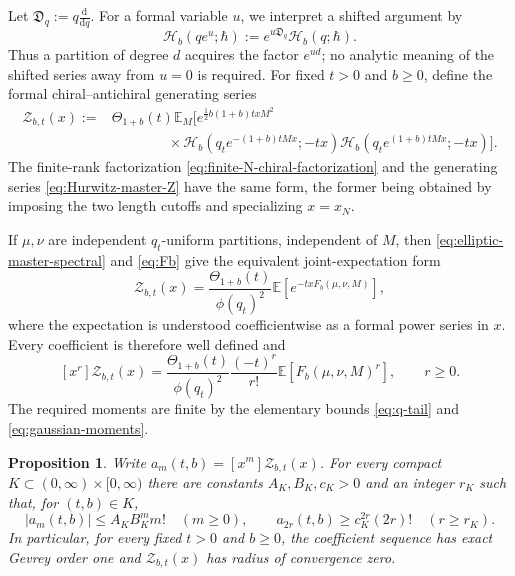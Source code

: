 \documentclass[11pt,a4paper,reqno]{article}
\newtheorem{proposition}[theorem]{Proposition}
\theoremstyle{definition}
\theoremstyle{remark}
\newcommand\E{{\mathbb E}}
\newcommand\dd{{\mathrm d}}
\begin{document}
Let $\mathfrak{D}_q:=q\frac{\dd}{\dd q}$.  For a formal variable $u$, we interpret a shifted argument by
\begin{equation}\label{eq:formal-q-shift}
\mathscr H_b(qe^u;\hbar) :=e^{u\mathfrak{D}_q}\mathscr H_b(q;\hbar).
\end{equation}
Thus a partition of degree $d$ acquires the factor $e^{ud}$; no analytic meaning of the shifted series away from $u=0$ is required.  For fixed $t>0$ and $b\geq0$, define the formal chiral--antichiral generating series
\begin{equation}\label{eq:Hurwitz-master-Z}
\begin{aligned}
\mathcal Z_{b,t}(x):={}&\Theta_{1+b}(t)\E_M\Big[e^{\frac12 b(1+b)txM^2}\\ &\qquad\qquad\times\mathscr H_b(q_t e^{-(1+b)tMx};-tx)\mathscr H_b(q_t e^{(1+b)tMx};-tx)\Big].
\end{aligned}
\end{equation}
The finite-rank factorization \eqref{eq:finite-N-chiral-factorization} and the generating series \eqref{eq:Hurwitz-master-Z} have the same form, the former being obtained by imposing the two length cutoffs and specializing $x=x_N$.

If $\mu,\nu$ are independent $q_t$-uniform partitions, independent of $M$, then \eqref{eq:elliptic-master-spectral} and \eqref{eq:Fb} give the equivalent joint-expectation form
\begin{equation}\label{eq:Hurwitz-master-expectation}
\mathcal Z_{b,t}(x) =\frac{\Theta_{1+b}(t)}{\phi(q_t)^2} \E\left[e^{-txF_b(\mu,\nu,M)}\right],
\end{equation}
where the expectation is understood coefficientwise as a formal power series in $x$.  Every coefficient is therefore well defined and
\begin{equation}\label{eq:master-coefficients}
[x^r]\mathcal Z_{b,t}(x) =\frac{\Theta_{1+b}(t)}{\phi(q_t)^2} \frac{(-t)^r}{r!} \E\left[F_b(\mu,\nu,M)^r\right], \qquad r\geq0.
\end{equation}
The required moments are finite by the elementary bounds \eqref{eq:q-tail} and \eqref{eq:gaussian-moments}.

\begin{proposition}\label{prop:master-zero-radius}
Write $a_m(t,b)=[x^m]\mathcal Z_{b,t}(x)$.  For every compact $K\subset(0,\infty)\times[0,\infty)$ there are constants $A_K,B_K,c_K>0$ and an integer $r_K$ such that, for $(t,b)\in K$,
\begin{equation}\label{eq:gevrey-coefficient-bounds}
|a_m(t,b)|\leq A_K B_K^m m!\quad(m\geq0), \qquad a_{2r}(t,b)\geq c_K^{2r}(2r)!\quad(r\geq r_K).
\end{equation}
In particular, for every fixed $t>0$ and $b\geq0$, the coefficient sequence has exact Gevrey order one and $\mathcal Z_{b,t}(x)$ has radius of convergence zero.
\end{proposition}
\end{document}
